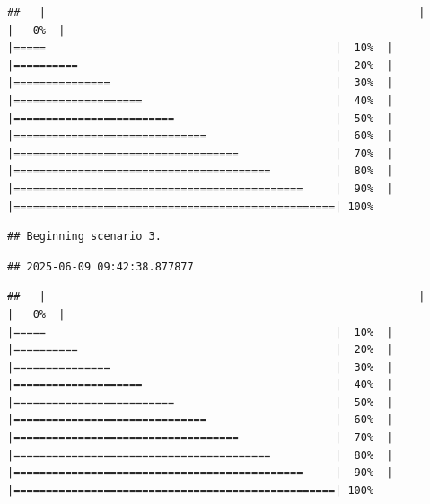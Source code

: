 \documentclass[
]{article}
\begin{document}
\begin{verbatim}
##   |                                                          |                                                  |   0%  |                                                          |=====                                             |  10%  |                                                          |==========                                        |  20%  |                                                          |===============                                   |  30%  |                                                          |====================                              |  40%  |                                                          |=========================                         |  50%  |                                                          |==============================                    |  60%  |                                                          |===================================               |  70%  |                                                          |========================================          |  80%  |                                                          |=============================================     |  90%  |                                                          |==================================================| 100%
\end{verbatim}

\begin{verbatim}
## Beginning scenario 3.
\end{verbatim}

\begin{verbatim}
## 2025-06-09 09:42:38.877877
\end{verbatim}

\begin{verbatim}
##   |                                                          |                                                  |   0%  |                                                          |=====                                             |  10%  |                                                          |==========                                        |  20%  |                                                          |===============                                   |  30%  |                                                          |====================                              |  40%  |                                                          |=========================                         |  50%  |                                                          |==============================                    |  60%  |                                                          |===================================               |  70%  |                                                          |========================================          |  80%  |                                                          |=============================================     |  90%  |                                                          |==================================================| 100%
\end{verbatim}
\end{document}
